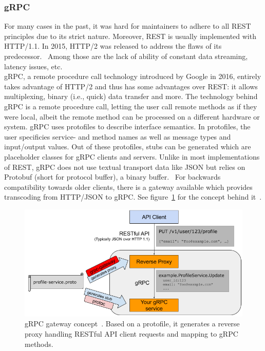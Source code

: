 \subsubsection{gRPC}
\label{sec:grpc}
For many cases in the past, it was hard for maintainers to adhere to all REST principles due to its strict nature. Moreover, REST is usually implemented with HTTP/1.1. In 2015, HTTP/2 was released to address the flaws of its predecessor.~\cite{Sayfan2018REST2018} Among those are the lack of ability of constant data streaming, latency issues, etc. \\ 
gRPC, a remote procedure call technology introduced by Google in 2016, entirely takes advantage of HTTP/2 and thus has some advantages over REST: it allows multiplexing, binary (i.e., quick) data transfer and more. The technology behind gRPC is a remote procedure call, letting the user call remote methods as if they were local, albeit the remote method can be processed on a different hardware or system. gRPC uses protofiles to describe interface semantics. In protofiles, the user specificies service- and method names as well as message types and input/output values. Out of these protofiles, stubs can be generated which are placeholder classes for gRPC clients and servers. Unlike in most implementations of REST, gRPC does not use textual transport data like JSON but relies on Protobuf (short for protocol buffer), a binary buffer.~\cite{Google-Cloud-Documentation2018Cloud2018} For backwards compatibility towards older clients, there is a gateway available which provides transcoding from HTTP/JSON to gRPC. See figure~\ref{ESP} for the concept behind it~\cite{gRPC-Gateway-Documentation2017Grpc-gateway.2018}.

\begin{figure}[ht]
	\centering
  \includegraphics[width=\textwidth]{img/grpc_gateway.png}
	\caption[gRPC gateway concept]{gRPC gateway concept~\cite{gRPC-Gateway-Documentation2017Grpc-gateway.2018}. Based on a protofile, it generates a reverse proxy handling RESTful API client requests and mapping to gRPC methods.}
	\label{ESP}
\end{figure}

